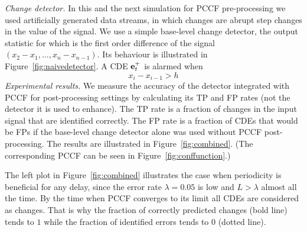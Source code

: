 \emph{Change detector.}
In this and the next simulation for PCCF pre-processing we used artificially generated data streams, in which changes are abrupt step changes in the value of the signal.
We use a simple base-level change detector, the output statistic for which is the first order difference of the signal $(x_2  - x_1, \dots, x_n - x_{n-1})$. Its behaviour is illustrated in Figure~\ref{fig:naivedetector}.
A CDE $\mathbf{e}_{t}^{+}$ is alarmed when
\begin{equation}
x_i - x_{i-1} > h
\label{eq:naive_detector}
\end{equation}
%
\emph{Experimental results.}
We measure the accuracy of the detector integrated with PCCF for post-processing settings by calculating its TP and FP rates (not the detector it is used to enhance).
The TP rate is a fraction of changes in the input signal that are identified correctly. The FP rate is a fraction of CDEs that would be FPs if the base-level change detector alone was used without PCCF post-processing.
The results are illustrated in Figure~\ref{fig:combined}.
(The corresponding PCCF can be seen in Figure~\ref{fig:conffunction}.)

The left plot in Figure~\ref{fig:combined} illustrates the case when periodicity is beneficial for any delay, since the error rate $\lambda=0.05$ is low and $L>\lambda$ almost all the time.
By the time when PCCF converges to its limit
all CDEs are considered as changes.
That is why the fraction of correctly predicted changes (bold line) tends to $1$ while the fraction of identified errors tends to $0$ (dotted line).

